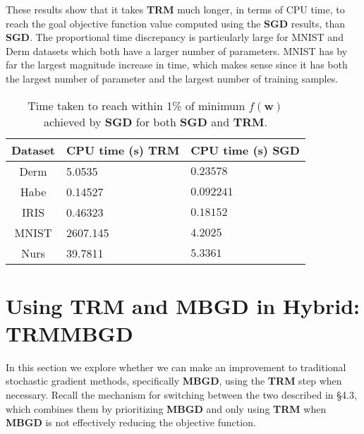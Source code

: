 \documentclass[letterpaper,12pt,titlepage,oneside,final]{book}
\begin{document}
	These results show that it takes \textbf{TRM} much longer, in terms of CPU time,
	to reach the goal objective function value computed using the \textbf{SGD} results, than \textbf{SGD}. The proportional time discrepancy is particularly large for MNIST and Derm datasets which both have a larger number of parameters. MNIST has by far the largest magnitude increase in time, which makes sense since it has both the largest number of parameter and the largest number of training samples. 
	
	\begin{table}[h] 
		\centering 
		\begin{tabular}{ |c|l|l| } 
			\hline 
			\textbf{Dataset} & CPU time (s) \textbf{TRM} & CPU time (s) \textbf{SGD}\\ 
			\hline 
			Derm &5.0535 & $\mathbf{0.23578}$\\ 
			\hline 
			Habe &0.14527 & $\mathbf{0.092241}$\\ 
			\hline 
			IRIS &0.46323 & $\mathbf{0.18152}$\\ 
			\hline 
			MNIST &2607.145 & $\mathbf{4.2025}$\\ 
			\hline 
			Nurs &39.7811 & $\mathbf{5.3361}$\\ 
			\hline 
		\end{tabular} 
		\caption{Time taken to reach within 1\% of minimum $f(\mathbf{w})$ achieved by \textbf{SGD} for both \textbf{SGD} and \textbf{TRM}.} \label{t_trm_sgd} \end{table}
	
	\section{Using TRM and MBGD in Hybrid: TRMMBGD}
	
	In this section we explore whether we can make an improvement to traditional stochastic gradient methods, specifically \textbf{MBGD}, using the \textbf{TRM} step when necessary. Recall the mechanism for switching between the two described in \S{4.3}, which combines them by prioritizing \textbf{MBGD} and only using \textbf{TRM} when \textbf{MBGD} is not effectively reducing the objective function. 
	
\end{document}
